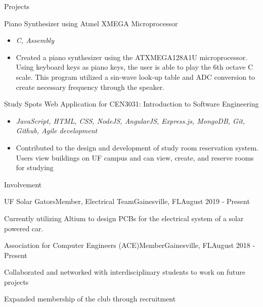 \documentclass{article}
\newlength{\tabin}
\newlength{\secsep}
\newcommand{\lineunder}{\vspace*{-8pt} \\ \hspace*{-6pt} \hrulefill \\ \vspace*{-15pt}}
\newenvironment{tabbedsection}[1]{
  \begin{list}{}{
      \setlength{\itemsep}{0pt}
      \setlength{\labelsep}{0pt}
      \setlength{\labelwidth}{0pt}
      \setlength{\leftmargin}{\tabin}
      \setlength{\rightmargin}{\tabin}
      \setlength{\listparindent}{0pt}
      \setlength{\parsep}{0pt}
      \setlength{\parskip}{0pt}
      \setlength{\partopsep}{0pt}
      \setlength{\topsep}{#1}
    }
  \item[]
}{\end{list}}
\newenvironment{resume_section}[1]{ 
  \filbreak
  \vspace{2\secsep}
  \MakeUppercase{ \large#1}
  \lineunder
  \begin{tabbedsection}{\secsep}
}{\end{tabbedsection}}
\newenvironment{resume_subsection}[2][]{
  \textbf{#2} \hfill {\footnotesize #1} \hspace{2em}
  \begin{tabbedsection}{0.5\secsep}
}{\end{tabbedsection}}
\newenvironment{subitems}{
  \renewcommand{\labelitemi}{-}
  \begin{itemize}
      \setlength{\labelsep}{1em}
}{\end{itemize}}
\newenvironment{resume_employer}[4]{
  \vspace{\secsep}
  \textbf{#1} \\ 
  \indent {\small #2} \hfill {\footnotesize#3 (#4)}
  \begin{tabbedsection}{0pt}
  \begin{subitems}
}{\end{subitems}\end{tabbedsection}}
\begin{document}
\begin{resume_section}{Projects}
  \begin{resume_subsection}[]{Piano Synthesizer using Atmel XMEGA Microprocessor}
  \begin{subitems}
    \item \textit{C, Assembly}
    \item Created a  piano synthesizer using the ATXMEGA128A1U microprocessor. Using keyboard keys as piano keys, the user is able to play the 6th octave C scale. This program utilized a sin-wave look-up table and ADC conversion to create necessary frequency through the speaker.
    \end{subitems}
  \end{resume_subsection}
  
   \begin{resume_subsection}[]{Study Spots Web Application for CEN3031: Introduction to Software Engineering}
  \begin{subitems}
    \item \textit{JavaScript, HTML, CSS, NodeJS, AngularJS, Express.js, MongoDB, Git, Github, Agile development}
    \item Contributed to the design and development of study room reservation system. Users view buildings on UF campus and can view, create, and reserve rooms for studying
    \end{subitems}
  \end{resume_subsection}
\end{resume_section}


\begin{resume_section}{Involvement}
  \begin{resume_employer}{UF Solar Gators}{Member, Electrical Team}{Gainesville, FL}{August 2019 - Present}
    \item Currently utilizing Altium to design PCBs for the electrical system of a solar powered car.
  \end{resume_employer}
  
  \begin{resume_employer}{Association for Computer Engineers (ACE)}{Member}{Gainesville, FL}{August 2018 - Present}
    \item Collaborated and networked with interdisciplinary students to work on future projects
    \item Expanded membership of the club through recruitment
  \end{resume_employer}

\end{resume_section}
 
\end{document}
